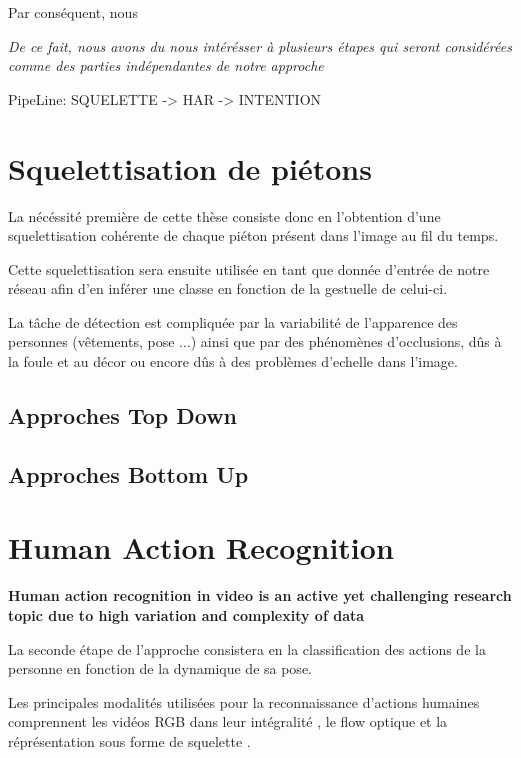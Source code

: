 Par conséquent, nous 

\textit{De ce fait, nous avons du nous intérésser à plusieurs étapes qui seront considérées comme des parties indépendantes de notre approche}


PipeLine: SQUELETTE -> HAR -> INTENTION

\section{Squelettisation de piétons}
La nécéssité première de cette thèse consiste donc en l'obtention d'une squelettisation cohérente de chaque piéton présent dans l'image au fil du temps.

Cette squelettisation sera ensuite utilisée en tant que donnée d'entrée de notre réseau afin d'en inférer une classe en fonction de la gestuelle de celui-ci.

La tâche de détection est compliquée par la variabilité de l’apparence des personnes (vêtements, pose ...)
ainsi que par des phénomènes d’occlusions, dûs à la foule et au décor ou encore dûs à des problèmes d'echelle dans l'image.




\label{subsec:SQUEL}
\subsection{Approches Top Down}
\subsection{Approches Bottom Up}

\section{Human Action Recognition}

\textbf{Human action recognition in video is an active yet challenging research topic due to high variation and complexity of data}

La seconde étape de l'approche consistera en la classification des actions de la personne en fonction de la dynamique de sa pose.

Les principales modalités utilisées pour la reconnaissance d'actions humaines comprennent les vidéos RGB dans leur intégralité \cite{donahue2015long,2014arXiv1412.0767T,varol2017long,Wu_2018_CVPR}, le flow optique \cite{simonyan2014two,zhang2016real,sevilla2018integration,DanutPOP} et la réprésentation sous forme de squelette \cite{vemulapalli2014human,du2015hierarchical,2016arXiv160707043L,2018arXiv180107455Y}.

